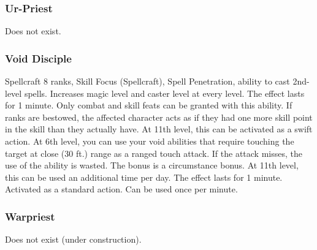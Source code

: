 \subsubsection{Ur-Priest}
Does not exist.
\subsubsection{Void Disciple}
 Spellcraft 8 ranks, Skill Focus (Spellcraft), Spell Penetration, ability to cast 2nd-level spells.
 Increases magic level and caster level at every level.
 The effect lasts for 1 minute. Only combat and skill feats can be granted with this ability. If ranks are bestowed, the affected character acts as if they had one more skill point in the skill than they actually have. At 11th level, this can be activated as a swift action.
 At 6th level, you can use your void abilities that require touching the target at close (30 ft.) range as a ranged touch attack. If the attack misses, the use of the ability is wasted.
 The bonus is a circumstance bonus. At 11th level, this can be used an additional time per day.
 The effect lasts for 1 minute. Activated as a standard action.
 Can be used once per minute.
\subsubsection{Warpriest}
Does not exist (under construction).

